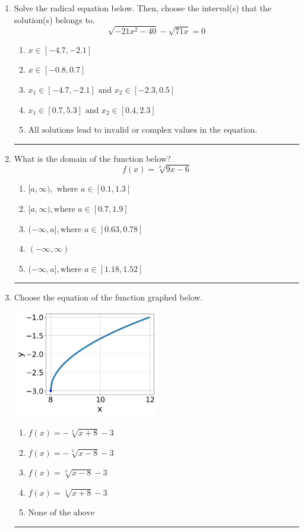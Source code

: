 \documentclass[14pt]{extbook}
\newcommand{\litem}[1]{\item#1\hspace*{-1cm}\rule{\textwidth}{0.4pt}}
\begin{document}
\begin{enumerate}
\litem{
Solve the radical equation below. Then, choose the interval(s) that the solution(s) belongs to.\[ \sqrt{-21 x^2 - 40} - \sqrt{71 x} = 0 \]\begin{enumerate}[label=\Alph*.]
\item \( x \in [-4.7,-2.1] \)
\item \( x \in [-0.8,0.7] \)
\item \( x_1 \in [-4.7, -2.1] \text{ and } x_2 \in [-2.3,0.5] \)
\item \( x_1 \in [0.7, 5.3] \text{ and } x_2 \in [0.4,2.3] \)
\item \( \text{All solutions lead to invalid or complex values in the equation.} \)

\end{enumerate} }
\litem{
What is the domain of the function below?\[ f(x) = \sqrt[8]{9 x - 6} \]\begin{enumerate}[label=\Alph*.]
\item \( [a, \infty), \text{ where } a \in [0.1, 1.3] \)
\item \( [a, \infty), \text{where } a \in [0.7, 1.9] \)
\item \( (-\infty, a], \text{where } a \in [0.63, 0.78] \)
\item \( (-\infty, \infty) \)
\item \( (-\infty, a], \text{where } a \in [1.18, 1.52] \)

\end{enumerate} }
\litem{
Choose the equation of the function graphed below.
\begin{center}
    \includegraphics[width=0.5\textwidth]{../Figures/radicalGraphToEquationB.png}
\end{center}
\begin{enumerate}[label=\Alph*.]
\item \( f(x) = - \sqrt[3]{x + 8} - 3 \)
\item \( f(x) = - \sqrt[3]{x - 8} - 3 \)
\item \( f(x) = \sqrt[3]{x - 8} - 3 \)
\item \( f(x) = \sqrt[3]{x + 8} - 3 \)
\item \( \text{None of the above} \)


\end{enumerate}}
\end{enumerate}
\end{document}
